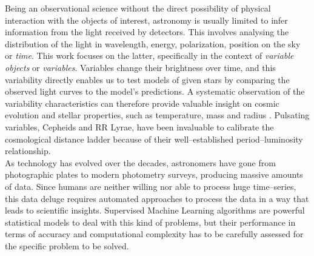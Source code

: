 

Being an observational science without the direct possibility of physical interaction with the objects of interest, astronomy is usually limited to infer information from the light received by detectors. This involves analysing the distribution of the light in wavelength, energy, polarization, position on the sky or \emph{time}. This work focuses on the latter, specifically in the context of \emph{variable objects} or \emph{variables}. Variables change their brightness over time, and this variability directly enables us to test models of given stars by comparing the observed light curves to the model's predictions. A systematic observation of the variability characteristics can therefore provide valuable insight on cosmic evolution and stellar properties, such as temperature, mass and radius \citep{percy2007}. Pulsating variables, \eg Cepheids and RR Lyrae, have been invaluable to calibrate the cosmological distance ladder because of their well--established period--luminosity relationship.\\

As technology has evolved over the decades, astronomers have gone from photographic plates to modern photometry surveys, producing massive amounts of data. Since humans are neither willing nor able to process huge time--series, this data deluge requires automated approaches to process the data in a way that leads to scientific insights. Supervised Machine Learning algorithms are powerful statistical models to deal with this kind of problems, but their performance in terms of accuracy and computational complexity has to be carefully assessed for the specific problem to be solved.\\


